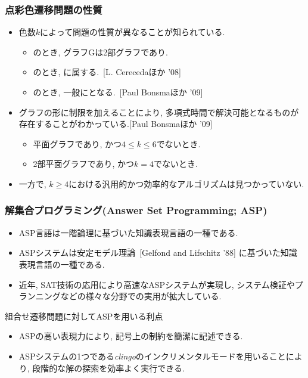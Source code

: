 \documentclass[dvipdfmx,11pt]{beamer}
\begin{document}
\begin{frame}\frametitle{点彩色遷移問題の性質}

  \begin{itemize}
    \item 色数$k$によって問題の性質が異なることが知られている.
    \begin{itemize}
      \item {}のとき, グラフGは2部グラフであり.
      \item {}のとき, に属する.~[L. Cerecedaほか '08]
      \item {}のとき, 一般にとなる.~[Paul Bonsmaほか '09]
    \end{itemize}

    \item グラフの形に制限を加えることにより, 多項式時間で解決可能となるものが存在することがわかっている.[Paul Bonsmaほか '09]
    \begin{itemize}
      \item 平面グラフであり, かつ$4 \le k \le 6$でないとき.
      \item 2部平面グラフであり, かつ$k=4$でないとき.
    \end{itemize}

    \item 一方で, \alert{$k \ge 4$における汎用的かつ効率的なアルゴリズムは見つかっていない}.

  \end{itemize}

\end{frame}


\begin{frame}\frametitle{解集合プログラミング(Answer Set Programming; ASP)}

  \begin{itemize}
    \item ASP言語は一階論理に基づいた知識表現言語の一種である.
    \item ASPシステムは安定モデル理論~[Gelfond and Lifschitz '88] に基づいた知識表現言語の一種である.
    \item 近年, SAT技術の応用により高速なASPシステムが実現し, システム検証やプランニングなどの様々な分野での実用が拡大している.
  \end{itemize}

  \begin{alertblock}{組合せ遷移問題に対してASPを用いる利点}
    \begin{itemize}
      \item ASPの高い表現力により, 記号上の制約を簡潔に記述できる.
      \item ASPシステムの1つである\textit{clingo}のインクリメンタルモードを用いることにより, 段階的な解の探索を効率よく実行できる.
    \end{itemize}
  \end{alertblock}
  
\end{frame}
\end{document}
